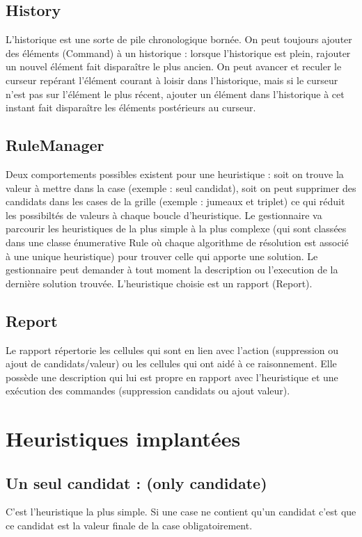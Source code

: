 \subsection{History}
L'historique est une sorte de pile chronologique bornée. On peut toujours ajouter des éléments (Command) à un historique : lorsque l'historique est plein, rajouter un nouvel élément fait disparaître le plus ancien. On peut avancer et 
reculer le curseur repérant l'élément courant à loisir dans l'historique, mais si le curseur n'est pas sur l'élément le 
plus récent, ajouter un élément dans l'historique à cet instant fait disparaître les éléments postérieurs au curseur.

\subsection{RuleManager}
Deux comportements possibles existent pour une heuristique : soit on trouve la valeur à mettre dans la case 
(exemple : seul candidat), soit on peut supprimer des candidats dans les cases de la grille (exemple : jumeaux et triplet)
ce qui réduit les possibiltés de valeurs à chaque boucle d'heuristique.
Le gestionnaire va parcourir les heuristiques de la plus simple à la plus complexe (qui sont classées dans une classe énumerative Rule où
chaque algorithme de résolution est associé à une unique heuristique) pour trouver celle qui apporte une solution.
Le gestionnaire peut demander à tout moment la description ou l'execution de la dernière solution trouvée.
L'heuristique choisie est un rapport (Report).

\subsection{Report}
Le rapport répertorie les cellules qui sont en lien avec l'action (suppression ou ajout de candidats/valeur) ou les cellules
qui ont aidé à ce raisonnement. Elle possède une description qui lui est propre en rapport avec l'heuristique et 
une exécution des commandes (suppression candidats ou ajout valeur).

\section{Heuristiques implantées}
\subsection{Un seul candidat : (only candidate)}
C'est l'heuristique la plus simple. Si une case ne contient qu'un candidat c'est que ce candidat est la valeur 
finale de la case obligatoirement.\\
\\

